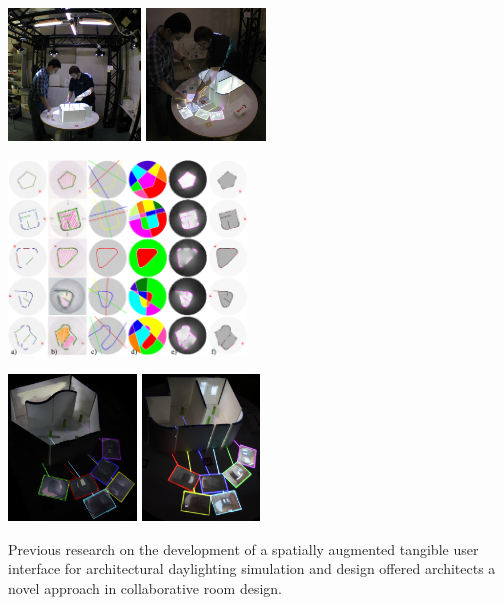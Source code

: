 \documentclass[landscape,final,a0paper,fontscale=0.285]{baposter}
\begin{document}
\begin{poster}
{  %
  {\includegraphics[height=9.5em]{img/ian_matt_contraption_frame.jpg}}
  {\includegraphics[height=9.5em]{img/ian_matt_pointing.jpg}}

  {\includegraphics[height=14em]{img/aag_figure_3.png}}

  {\includegraphics[height=10.5em]{img/museum_false_color2.jpg}} 
  {\includegraphics[height=10.5em]{img/office_color.jpg}}

Previous research on the development of a spatially augmented tangible user interface for architectural daylighting simulation and design offered architects a novel approach in collaborative room design. \cite{NasmanEvaluation, ShengYYC09 }

}
\end{poster}
\end{document}
